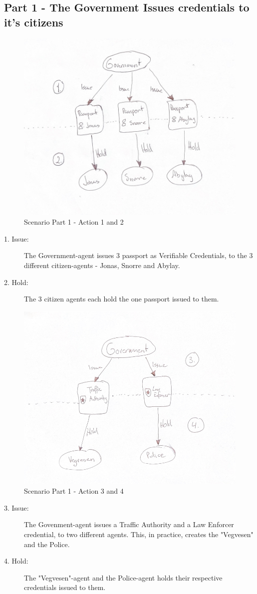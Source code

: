 \subsection{Part 1 - The Government Issues credentials to it's citizens}


    \begin{figure}[htbp]
      \centering
      \includegraphics[width=.5\textwidth]{figures/scenario-1-2.png}
      \caption[]{Scenario Part 1 - Action 1 and 2}
    \end{figure}


\begin{description}
    \item[1. Issue:] The Government-agent issues 3 passport as Verifiable Credentials, to the 3 different citizen-agents - Jonas, Snorre and Abylay.
    \item[2. Hold:] The 3 citizen agents each hold the one passport issued to them.
\end{description}

    \begin{figure}[htbp]
      \centering
      \includegraphics[width=.5\textwidth]{figures/scenario-3-4.png}
      \caption[]{Scenario Part 1 - Action 3 and 4}
    \end{figure}

\begin{description}
    \item[3. Issue:] The Govenment-agent issues a Traffic Authority and a Law Enforcer credential, to two different agents. This, in practice, creates the "Vegvesen" and the Police.
    \item[4. Hold:]The "Vegvesen"-agent and the Police-agent holds their respective credentials issued to them.
\end{description}


